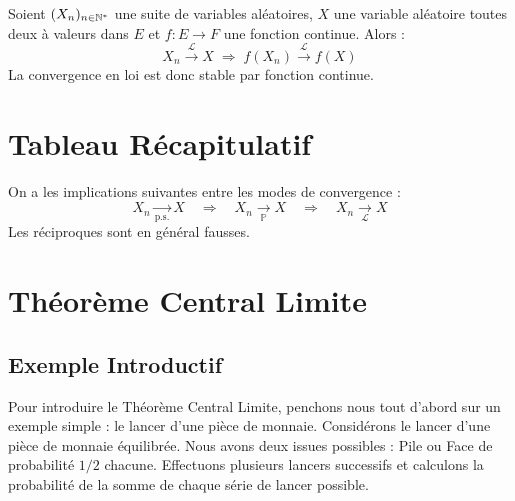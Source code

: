 \begin{prop}[Stabilité]
    Soient $(X_n)_{n \in \mathbb{N}^*}$ une suite de variables aléatoires, $X$ une variable aléatoire toutes deux à valeurs 
    dans $E$ et $f : E \longrightarrow F$ une fonction continue. 
    Alors : 
        \[  X_n \overset{ \mathcal{L}}{\longrightarrow} X \; \Longrightarrow \; f(X_n) \overset{ \mathcal{L}}{\longrightarrow} f(X) \] 
    La convergence en loi est donc stable par fonction continue. 
\end{prop}


\section{Tableau Récapitulatif}

\begin{remark}
    On a les implications suivantes entre les modes de convergence :
    \[
        X_n \xrightarrow[\text{p.s.}]{} X \quad \Longrightarrow \quad X_n \xrightarrow[\mathbb{P}]{} X \quad \Longrightarrow \quad X_n \xrightarrow[\mathcal{L}]{} X
    \]
    Les réciproques sont en général fausses.
\end{remark}



\newpage
\section{Théorème Central Limite}

\subsection{Exemple Introductif}

Pour introduire le Théorème Central Limite, penchons nous tout d'abord sur un exemple simple : le lancer d'une pièce de monnaie. 
Considérons le lancer d'une pièce de monnaie équilibrée. Nous avons deux issues possibles : Pile ou Face 
de probabilité $1/2$ chacune. Effectuons plusieurs lancers successifs et calculons la probabilité 
de la somme de chaque série de lancer possible. 

\vspace{0.3cm}

